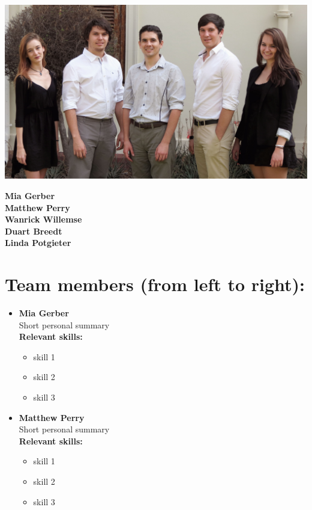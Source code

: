 \documentclass[11pt,pressrelease]{newlfm} %
\begin{document}
\begin{newlfm}


\begin{singlespace} %

\begin{center}
	\includegraphics[width=0.5\linewidth]{team.jpg}
\end{center}

\begin{center}
	\large
	\textbf{Mia Gerber}
	\\
	\textbf{Matthew Perry}
	\\
	\textbf{Wanrick Willemse}
	\\
	\textbf{Duart Breedt}
	\\
	\textbf{Linda Potgieter}
\end{center}
\newpage

	\section{Team members (from left to right):}
	\begin{itemize}
		\item \textbf{Mia Gerber}
		\\
		\textnormal Short personal summary
		\\
		\textbf{\small Relevant skills:}
		\begin{itemize}
			\item skill 1
			\item skill 2
			\item skill 3
		\end{itemize}
		
		
		\item \textbf{Matthew Perry}
		\\
		\textnormal Short personal summary
		\\
		\textbf{\small Relevant skills:}
		\begin{itemize}
			\item skill 1
			\item skill 2
			\item skill 3
		\end{itemize}
		

\end{itemize}
\end{singlespace}
\end{newlfm}
\end{document}
